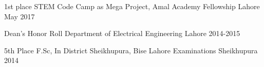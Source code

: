 
\begin{cvhonors}
    \cvhonor
    {1st place}
    {STEM Code Camp as Mega Project, Amal Academy Fellowship}
    {Lahore}
    {May 2017}
	
	\cvhonor
	{Dean's Honor Roll}
	{Department of Electrical Engineering}
	{Lahore}
	{2014-2015}
	
	\cvhonor
	{5th Place}
	{F.Sc, In District Sheikhupura, Bise Lahore Examinations}
	{Sheikhupura}
	{2014}
	
\end{cvhonors}

